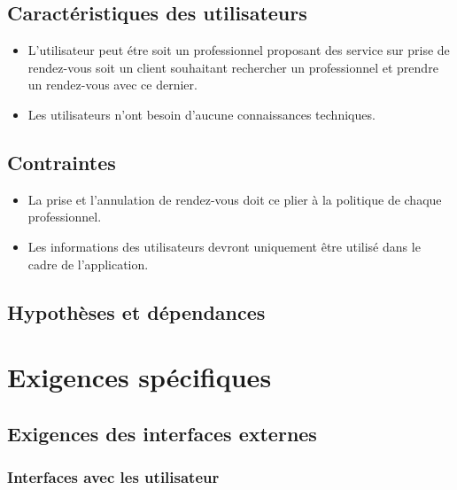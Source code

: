 \documentclass{article}
\begin{document}
\subsection{Caractéristiques des utilisateurs}
\begin{itemize}
\item L'utilisateur peut étre soit un professionnel proposant des
  service sur prise de rendez-vous soit
  un client souhaitant rechercher un professionnel et prendre un
  rendez-vous avec ce dernier.
\item Les utilisateurs n'ont besoin d'aucune connaissances techniques.
\end{itemize}
\subsection{Contraintes}
\begin{itemize}
\item La prise et l'annulation de rendez-vous doit ce plier à la
  politique de chaque professionnel.
\item Les informations des utilisateurs devront uniquement être
  utilisé dans le cadre de l'application.
\end{itemize}
\subsection{Hypothèses et dépendances}


\section{Exigences spécifiques}
\subsection{Exigences des interfaces externes}
\subsubsection{Interfaces avec les utilisateur}
\end{document}
